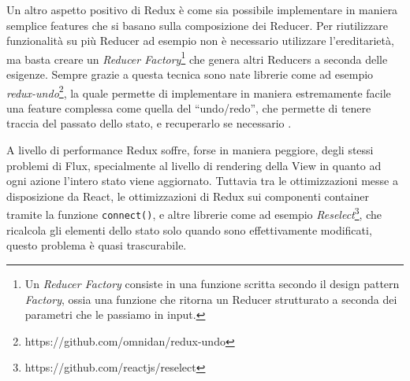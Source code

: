 Un altro aspetto positivo di Redux è come sia possibile implementare in maniera semplice features che si basano sulla composizione dei Reducer. Per riutilizzare funzionalità su più Reducer ad esempio non è necessario utilizzare l'ereditarietà, ma basta creare un \textit{Reducer Factory}\footnote{Un \textit{Reducer Factory} consiste in una funzione scritta secondo il design pattern \textit{Factory}, ossia una funzione che ritorna un Reducer strutturato a seconda dei parametri che le passiamo in input.} che genera altri Reducers a seconda delle esigenze.
Sempre grazie a questa tecnica sono nate librerie come ad esempio \textit{redux-undo}\footnote{https://github.com/omnidan/redux-undo}, la quale permette di implementare in maniera estremamente facile una feature complessa come quella del “undo/redo”, che permette di tenere traccia del passato dello stato, e recuperarlo se necessario \cite{AbramovOnReduxVsFlux}.

A livello di performance Redux soffre, forse in maniera peggiore, degli stessi problemi di Flux, specialmente al livello di rendering della View in quanto ad ogni azione l'intero stato viene aggiornato. Tuttavia tra le ottimizzazioni messe a disposizione da React, le ottimizzazioni di Redux sui componenti container tramite la funzione \texttt{connect()}, e altre librerie come ad esempio \textit{Reselect}\footnote{https://github.com/reactjs/reselect}, che ricalcola gli elementi dello stato solo quando sono effettivamente modificati, questo problema è quasi trascurabile.